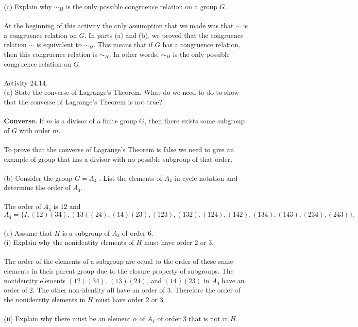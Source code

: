 \documentclass[11pt,a4paper]{article}
\begin{document}
(c) Explain why $\sim_H$ is the only possible congruence relation on a group $G$.\\
~\\
At the beginning of this activity the only assumption that we made was that $\sim$ is a congruence relation on $G$. In parts (a) and (b), we proved that the congruence relation $\sim$ is equivalent to $\sim_H$. This means that if $G$ has a congruence relation, then this congruence relation is $\sim_H$. In other words, $\sim_H$ is the only possible congruence relation on $G$.\\
~\\
Activity 24.14.\\
(a) State the converse of Lagrange's Theorem. What do we need to do to show that the converse of Lagrange's Theorem is not true?\\
~\\
{\bf Converse.} If  $m$ is a divisor of a finite group $G$, then there exists some subgroup of $G$ with order $m$.\\
~\\
To prove that the converse of Lagrange's Theorem is false we need to give an example of group that has a divisor with no possible subgroup of that order.\\
~\\
(b) Consider the group $G = A_4$ . List the elements of $A_4$ in cycle notation and determine the order of $A_4$.\\
~\\
The order of $A_4$ is $12$ and 
\[A_4 = \{ I, (12)(34), (13)(24), (14)(23), (123), (132), (124), (142), (134), (143), (234), (243) \}.\]
\\
(c) Assume that $H$ is a subgroup of $A_4$ of order $6$.\\
(i) Explain why the nonidentity elements of $H$ must have order $2$ or $3$.\\
~\\
The order of the elements of a subgroup are equal to the order of these same elements in their parent group due to the closure property of subgroups. The nonidentity elements $(12)(34)$, $(13)(24)$, and $(14)(23)$ in $A_4$ have an order of $2$. The other non-identity all have an order of $3$. Therefore the order of the nonidentity elements in $H$ must have order $2$ or $3$.\\
~\\
(ii) Explain why there must be an element $\alpha$ of $A_4$ of order $3$ that is not in $H$.\\
~\\
\end{document}
